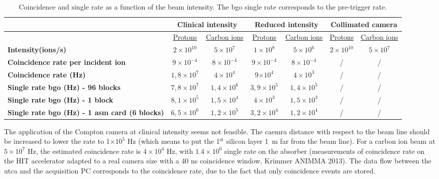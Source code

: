 \begin{table} [!htbp]
\centering
\caption{Coincidence and single rate as a function of the beam intensity. The \gls{bgo} single rate corresponds to the pre-trigger rate.}
\label{chapappA::tab::coincSingleRate}
\begin{tabular}{m{3.2cm} c c c c c c}
\toprule
\rowcolor{myColorMainA!20}
		& \multicolumn{2}{c}{\textbf{Clinical intensity}} &\multicolumn{2}{c}{\textbf{Reduced intensity}} &\multicolumn{2}{c}{ \textbf{Collimated camera}}\\
\midrule		
		& \underline{Protons}& \underline{Carbon ions} & \underline{Protons}& \underline{Carbon ions} &\underline{Protons}& \underline{Carbon ions} \\
\midrule
\textbf{Intensity(ions/s)}		& $2\times10^{10}$	&$5\times10^{7}$  & $1\times10^{8}$& $5\times10^{6}$ &$2\times10^{10}$& $5\times10^{7}$ \\
\textbf{Coincidence rate per incident ion}		& $9\times10^{-4}$&  $8\times10^{-4}$&  $9\times10^{-4}$& $8\times10^{-4}$& / &  / \\
\textbf{Coincidence rate (Hz)}		& $1,8\times10^{7}$&  $4\times10^{4}$&  9$\times10^{4}$& $4\times10^{3}$& / &  / \\
\textbf{Single rate \gls{bgo} (Hz) - 96 blocks}		& 	$7,8\times10^{7}$& $1,4\times10^{6}$ & $3,9\times10^{5}$&$1,4\times10^{5}$ &/&/\\
\textbf{Single rate \gls{bgo} (Hz) - 1 block}		& 	$8,1\times10^{5}$& $1,5\times10^{4}$ & $4\times10^{3}$&$1,5\times10^{3}$ &/&/\\
\textbf{Single rate \gls{bgo} (Hz) - 1 \gls{asm} card (6 blocks)}		& 	$6,5\times10^{6}$& $1,2\times10^{5}$ & $3,2\times10^{4}$&$1,2\times10^{4}$ &/&/\\
\bottomrule
\end{tabular}
\end{table}


The application of the Compton camera at clinical intensity seems not feasible. The caemra distance with respect to the beam line should be increased to lower the rate to 1$\mathrm{\times10^{5}}$ Hz (which means to put the 1$\mathrm{^{st}}$ silicon layer 1~m far from the beam line).
For a carbon ion beam at $5\times10^{7}$ Hz, the estimated coincidence rate is $4\times10^{4}$ Hz, with $1.4\times10^{6}$ single rate on the absorber (measurements of coincidence rate on the HIT accelerator adapted to a real camera size with a 40 ns coincidence window, Krimmer ANIMMA 2013).
The data flow between the \gls{utca} and the acquisition PC corresponds to the coincidence rate, due to the fact that only coincidence events are stored.


